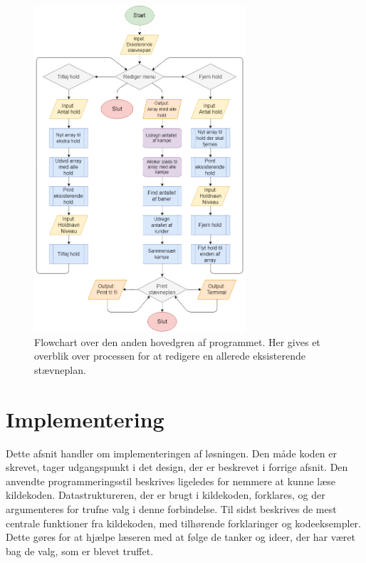 \begin{figure}[H]
  \centering
  \includegraphics[width=0.7\textwidth]{figures/Rediger_staevneplan.png}
  \caption{Flowchart over den anden hovedgren af programmet. Her gives et overblik over processen for at redigere en allerede eksisterende stævneplan.}
  \label{fig:rediger-flowchart}
\end{figure}

\clearpage

\section{Implementering}\label{implementering}
Dette afsnit handler om implementeringen af løsningen. Den måde koden er skrevet, tager udgangspunkt i det design, der er beskrevet i forrige afsnit. Den anvendte programmeringsstil beskrives ligeledes for nemmere at kunne læse kildekoden. Datastruktureren, der er brugt i kildekoden, forklares, og der argumenteres for trufne valg i denne forbindelse. Til sidst beskrives de mest centrale funktioner fra kildekoden, med tilhørende forklaringer og kodeeksempler. Dette gøres for at hjælpe læseren med at følge de tanker og ideer, der har været bag de valg, som er blevet truffet.

